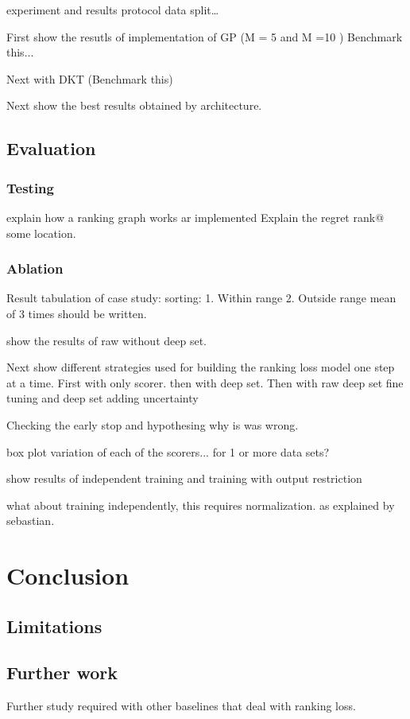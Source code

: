 \documentclass[11pt]{report}
\begin{document}
experiment and results
protocol
data split…

First show the resutls of implementation of GP (M = 5 and M =10 )
Benchmark this...

Next with DKT (Benchmark this)

Next show the best results obtained by architecture.

\section{Evaluation}
\subsection{Testing}
explain how a ranking graph works ar implemented
Explain the regret rank@ some location.

\subsection{Ablation}

Result tabulation of case study: sorting:
1.  Within range
2.   Outside range 
mean of 3 times should be written.

show the results of raw without deep set.

Next show different strategies used for building the ranking loss model one step at a time.
First with only scorer.
then with deep set.
Then with raw deep set
fine tuning and deep set
adding uncertainty

Checking the early stop and hypothesing why is was wrong.

box plot variation of each of the scorers... for 1 or more data sets?

show results of independent training and training with output restriction

what about training independently,   this requires normalization. 
as explained by sebastian.

\chapter{Conclusion}

\section{Limitations}

\section{Further work}
Further study required with other baselines that deal with ranking loss.
\end{document}
